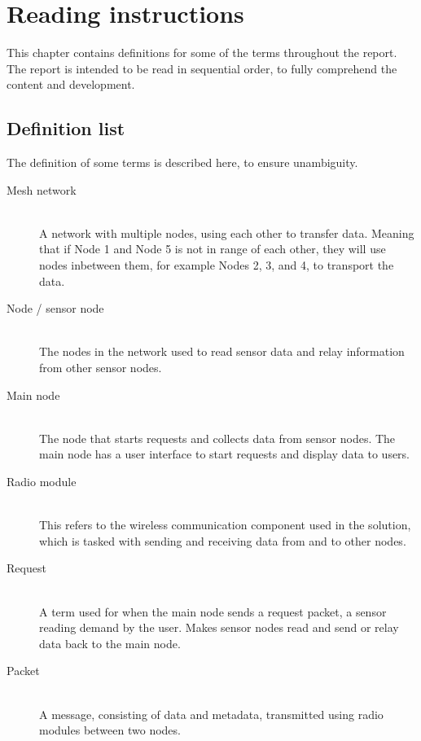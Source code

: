 \chapter{Reading instructions}
This chapter contains definitions for some of the terms throughout the report. The report is intended to be read in sequential order, to fully comprehend the content and development.

\section*{Definition list}
The definition of some terms is described here, to ensure unambiguity.

\begin{description}
\item[Mesh network] \hfill \\
A network with multiple nodes, using each other to transfer data. Meaning that if Node 1 and Node 5 is not in range of each other, they will use nodes inbetween them, for example Nodes 2, 3, and 4, to transport the data.

\item[Node / sensor node] \hfill \\
The nodes in the network used to read sensor data and relay information from other sensor nodes.

\item[Main node] \hfill \\
The node that starts requests and collects data from sensor nodes. The main node has a user interface to start requests and display data to users.

\item[Radio module] \hfill \\
This refers to the wireless communication component used in the solution, which is tasked with sending and receiving data from and to other nodes.

\item[Request] \hfill \\
A term used for when the main node sends a request packet, a sensor reading demand by the user. Makes sensor nodes read and send or relay data back to the main node.

\item[Packet] \hfill \\
A message, consisting of data and metadata, transmitted using radio modules between two nodes.

\end{description}
